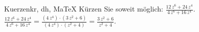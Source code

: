 \begin{MAufgabe}{Kuerzen}{kr, dh, MaTeX}
K\"urzen Sie soweit m\"oglich: $\frac{12\, z^6 + 24\, z^4}{4\, z^6 + 16\, z^4}$.\\ 
\ifLsg\MLoesung
\quad $\frac{12\, z^6 + 24\, z^4}{4\, z^6 + 16\, z^4}=\frac{(4\, z^4)\cdot(3\, z^2 + 6)}{(4\, z^4)\cdot(z^2 + 4)}=\frac{3\, z^2 + 6}{z^2 + 4}$.\else\relax\fi
 \end{MAufgabe}